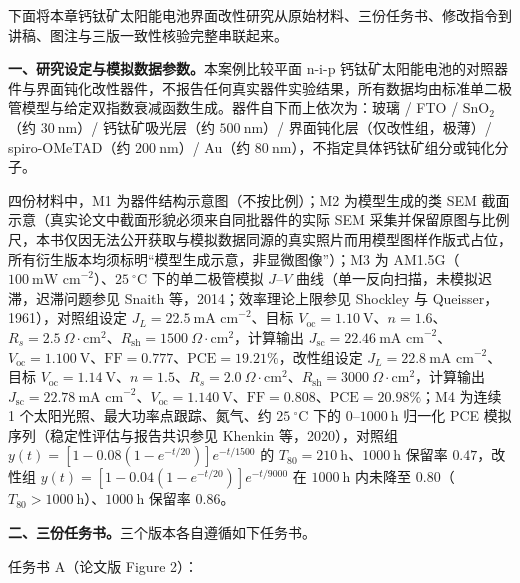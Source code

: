 下面将本章钙钛矿太阳能电池界面改性研究从原始材料、三份任务书、修改指令到讲稿、图注与三版一致性核验完整串联起来。

\textbf{一、研究设定与模拟数据参数。}本案例比较平面 n-i-p 钙钛矿太阳能电池的对照器件与界面钝化改性器件，不报告任何真实器件实验结果，所有数据均由标准单二极管模型与给定双指数衰减函数生成。器件自下而上依次为：玻璃 / FTO / $\text{SnO}_2$（约 $30\ \text{nm}$）/ 钙钛矿吸光层（约 $500\ \text{nm}$）/ 界面钝化层（仅改性组，极薄）/ spiro-OMeTAD（约 $200\ \text{nm}$）/ Au（约 $80\ \text{nm}$），不指定具体钙钛矿组分或钝化分子。

四份材料中，M1 为器件结构示意图（不按比例）；M2 为模型生成的类 SEM 截面示意（真实论文中截面形貌必须来自同批器件的实际 SEM 采集并保留原图与比例尺，本书仅因无法公开获取与模拟数据同源的真实照片而用模型图样作版式占位，所有衍生版本均须标明“模型生成示意，非显微图像”）；M3 为 AM1.5G（$100\ \text{mW cm}^{-2}$）、$25\ ^\circ\text{C}$ 下的单二极管模拟 $J\text{--}V$ 曲线（单一反向扫描，未模拟迟滞，迟滞问题参见 Snaith 等，2014；效率理论上限参见 Shockley 与 Queisser，1961），对照组设定 $J_L = 22.5\ \text{mA cm}^{-2}$、目标 $V_{\text{oc}} = 1.10\ \text{V}$、$n = 1.6$、$R_s = 2.5\ \Omega\cdot\text{cm}^2$、$R_{\text{sh}} = 1500\ \Omega\cdot\text{cm}^2$，计算输出 $J_{\text{sc}} = 22.46\ \text{mA cm}^{-2}$、$V_{\text{oc}} = 1.100\ \text{V}$、$\text{FF} = 0.777$、$\text{PCE} = 19.21\%$，改性组设定 $J_L = 22.8\ \text{mA cm}^{-2}$、目标 $V_{\text{oc}} = 1.14\ \text{V}$、$n = 1.5$、$R_s = 2.0\ \Omega\cdot\text{cm}^2$、$R_{\text{sh}} = 3000\ \Omega\cdot\text{cm}^2$，计算输出 $J_{\text{sc}} = 22.78\ \text{mA cm}^{-2}$、$V_{\text{oc}} = 1.140\ \text{V}$、$\text{FF} = 0.808$、$\text{PCE} = 20.98\%$；M4 为连续 1 个太阳光照、最大功率点跟踪、氮气、约 $25\ ^\circ\text{C}$ 下的 $0\text{--}1000\ \text{h}$ 归一化 PCE 模拟序列（稳定性评估与报告共识参见 Khenkin 等，2020），对照组 $y(t) = [1 - 0.08(1 - e^{-t/20})]e^{-t/1500}$ 的 $T_{80} = 210\ \text{h}$、$1000\ \text{h}$ 保留率 $0.47$，改性组 $y(t) = [1 - 0.04(1 - e^{-t/20})]e^{-t/9000}$ 在 $1000\ \text{h}$ 内未降至 $0.80$（$T_{80} > 1000\ \text{h}$）、$1000\ \text{h}$ 保留率 $0.86$。

\textbf{二、三份任务书。}三个版本各自遵循如下任务书。

任务书 A（论文版 Figure 2）：

